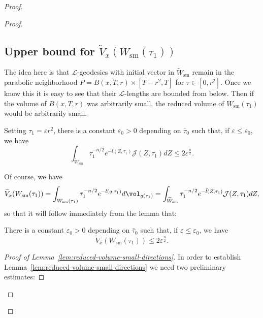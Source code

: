 \begin{proof}
\begin{proof}
\subsection{Upper bound for  $\widetilde V_x(W_{\mathrm{sm}}(\tau_1))$}

The idea here is that ${\mathcal L}$-geodesics with initial vector
in $\widetilde W_{\mathrm{sm}}$ remain in the parabolic neighborhood
$P=B(x,T,r)\times [T-r^2,T]$ for $\tau\in [0,r^2]$. Once we know
this it is easy to see that their ${\mathcal L}$-lengths are bounded
from below. Then if the volume of $B(x,T,r)$ was arbitrarily small,
the reduced volume of  $W_{\mathrm{sm}}(\tau_1)$ would be arbitrarily
small.

\begin{lemma}\label{lem:reduced-volume-small-directions}
\label{small}
Setting $\tau_1=\varepsilon r^2$, there is a constant
$\varepsilon_0>0$ depending on $\bar\tau_0$ such that, if
$\varepsilon\le \varepsilon_0$, we have
$$\int_{\widetilde
W_{\mathrm{sm}}}\tau_1^{-n/2}e^{-\tilde l(Z,\tau_1)}{\mathcal
J}(Z,\tau_1)dZ\le 2\varepsilon^{\frac{n}{2}}.$$
\end{lemma}

Of course,  we have
$$\widetilde V_x(W_{\mathrm{sm}}(\tau_1))=\int_{W_{\mathrm{sm}}(\tau_1)}\tau_1^{-n/2}e^{-l(q,\tau_1)}d\vol_{g(\tau_1)}=\int_{\widetilde W_{\mathrm{sm}}}\tau_1^{-n/2}e^{-\tilde
l(Z,\tau_1)}{\mathcal J}(Z,\tau_1)dZ,$$ so that it will follow
immediately from the lemma that:

\begin{corollary}\label{cor:reduced-volume-small-bound}
There is a  constant $\varepsilon_0>0$ depending on $\bar\tau_0$
such that, if $\varepsilon\le \varepsilon_0$, we have
$$\widetilde V_x(W_{\mathrm{sm}}(\tau_1))\le 2\varepsilon^{\frac{n}{2}}.$$
\end{corollary}



\begin{proof}[Proof of Lemma~\ref{lem:reduced-volume-small-directions}]
In order to establish Lemma~\ref{lem:reduced-volume-small-directions} we need two preliminary
estimates:



\end{proof}
\end{proof}
\end{proof}
